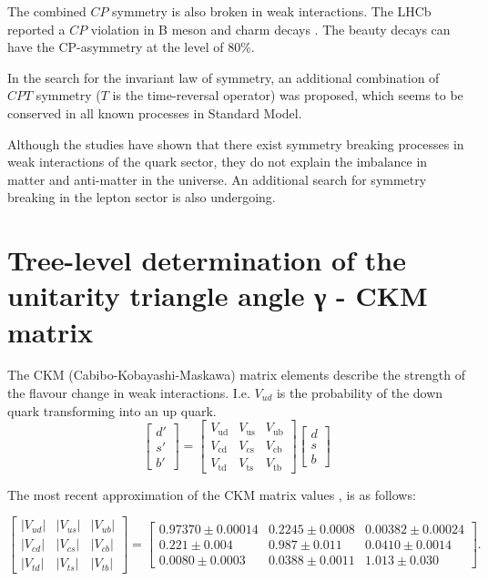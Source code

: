 The combined $CP$ symmetry is also broken \cite{PhysRevLett.13.138} in weak interactions. The LHCb reported a $CP$ violation in B meson \cite{PhysRevLett.110.221601} and charm decays \cite{PhysRevLett.122.211803}. The beauty decays can have the CP-asymmetry at the level of 80\%.

In the search for the invariant law of symmetry, an additional combination of $CPT$ symmetry ($T$ is the time-reversal operator) was proposed, which seems to be conserved in all known processes in Standard Model.

Although the studies have shown that there exist symmetry breaking processes in weak interactions of the quark sector, they do not explain the imbalance in matter and anti-matter in the universe.
An additional search for symmetry breaking in the lepton sector is also undergoing.


\section{Tree-level determination of the unitarity triangle angle γ - CKM matrix}
\label{sec:tree-ckm}

The CKM (Cabibo-Kobayashi-Maskawa) matrix elements describe the strength of the flavour change in weak interactions. I.e. $V_{ud}$ is the probability of the down quark transforming into an up quark.
$$
\begin{bmatrix}  d'  \\  s'  \\  b'  \end{bmatrix} = \begin{bmatrix} V_\mathrm{ud} & V_\mathrm{us} & V_\mathrm{ub} \\ V_\mathrm{cd} & V_\mathrm{cs} & V_\mathrm{cb} \\ V_\mathrm{td} & V_\mathrm{ts} & V_\mathrm{tb} \end{bmatrix} \begin{bmatrix}  d  \\  s  \\  b  \end{bmatrix}
$$

The most recent approximation of the CKM matrix values \cite{10.1093/ptep/ptaa104}, is as follows:

$$
\begin{bmatrix}
|V_{ud}| & |V_{us}| & |V_{ub}| \\
|V_{cd}| & |V_{cs}| & |V_{cb}| \\
|V_{td}| & |V_{ts}| & |V_{tb}|
\end{bmatrix} = \begin{bmatrix}
0.97370 \pm 0.00014 & 0.2245 \pm 0.0008 & 0.00382 \pm 0.00024 \\
0.221 \pm 0.004 & 0.987 \pm 0.011 & 0.0410 \pm 0.0014 \\
0.0080 \pm 0.0003 & 0.0388 \pm 0.0011  & 1.013 \pm 0.030
\end{bmatrix}.
$$


